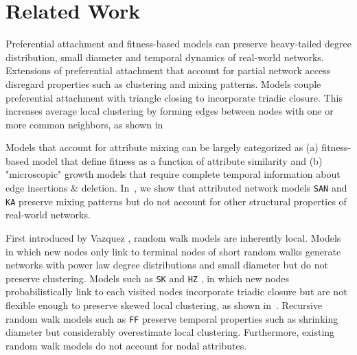 
\section{Related Work}
\label{sec:Related Work}

Preferential attachment and fitness-based models \cite{bell2017network,medo2011temporal,bianconi2001bose,caldarelli2002scale}
can preserve heavy-tailed degree distribution, small diameter \cite{bollobas2004diameter} and temporal dynamics \cite{wang2013quantifying}
of real-world networks. Extensions of preferential attachment \cite{mossa2002truncation,zeng2005construction,wang2009local} that account for
partial network access disregard properties such as clustering and mixing patterns.
Models
\cite{holme2002growing,klemm2002highly,leskovec2008microscopic}
couple preferential attachment with triangle closing to incorporate triadic closure.
This increases {average} local clustering by forming edges between nodes
with one or more common neighbors, as shown in~


Models \cite{de2013scale,karimi2017visibility,gong2012evolution,zheleva2009co}
that account for attribute mixing can be largely categorized as (a) fitness-based model that define fitness as a function of
attribute similarity and (b) "microscopic" growth models  that require
complete temporal information about edge insertions \& deletion.
In~, we show that attributed network models
\texttt{SAN} and \texttt{KA} preserve mixing patterns but do not account for other
structural properties of real-world networks.

First introduced by Vazquez \cite{vazquez2000knowing}, random walk models are inherently local.
Models \cite{blum2006random} in which
new nodes only link to terminal nodes of short random walks generate
networks with power law degree distributions \cite{chebolu2008pagerank} and
small diameter \cite{mehrabian2016sa} but do not preserve clustering. Models
such as \texttt{SK} \cite{saramaki2004scale}
and \texttt{HZ} \cite{herrera2011generating}, in which new nodes probabilistically link to
each visited nodes incorporate triadic closure but are not flexible enough to preserve
{skewed} local clustering, as shown in~.
Recursive random walk models such as \texttt{FF} \cite{leskovec2005graphs}
preserve temporal properties such as shrinking diameter but considerably overestimate local clustering.
Furthermore, existing random walk models do not account for nodal attributes.

